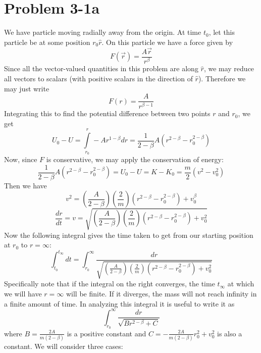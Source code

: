
\section*{Problem 3-1a}
We have particle moving radially away from the origin. At time $t_0$, let this particle be at some position $r_0 \hat{r}$. On this particle we have a force given by 
\[ F(\vec{r}) = \frac{A\vec{r}}{r^\beta} \]
Since all the vector-valued quantities in this problem are along $\hat{r}$, we may reduce all vectors to scalars (with positive scalars in the direction of $\hat{r}$). Therefore we may just write
\[ F(r) = \frac{A}{r^{\beta-1}} \]
Integrating this to find the potential difference between two points $r$ and $r_0$, we get
\[ U_0 - U=  \int\limits_{r_0}^r -Ar^{1-\beta} dr = \frac{1}{2-\beta} A(r^{2-\beta}-r_0^{2-\beta}) \]
Now, since $F$ is conservative, we may apply the conservation of energy:
\[  \frac{1}{2-\beta} A(r^{2-\beta}-r_0^{2-\beta})  = U_0-U = K-K_0 = \frac{m}{2}(v^2-v_0^2) \]
Then we have
\[ v^2 = \left(\frac{A}{2-\beta}\right)\left(\frac{2}{m}\right)(r^{2-\beta} - r_0^{2-\beta}) + v_0^\beta \]
\[ \frac{dr}{dt} = v = \sqrt{\left(\frac{A}{2-\beta}\right)\left(\frac{2}{m}\right)(r^{2-\beta} - r_0^{2-\beta}) + v_0^2} \]
Now the following integral gives the time taken to get from our starting position at $r_0$ to $r=\infty$:
\[ \int_{t_0}^{t_\infty} dt = \int_{r_0}^{\infty} \dfrac{dr}{\sqrt{\left(\frac{A}{2-\beta}\right)\left(\frac{2}{m}\right)(r^{2-\beta} - r_0^{2-\beta}) + v_0^2} } \]
Specifically note that if the integral on the right converges, the time $t_\infty$ at which we will have $r=\infty$ will be finite. If it diverges, the mass will not reach infinity in a finite amount of time. 
In analyzing this integral it is useful to write it as 
\[ \int_{r_0}^\infty \dfrac{dr}{\sqrt{Br^{2-\beta}+C}} \]
where $B=\frac{2A}{m(2-\beta)}$ is a positive constant and $C=-\frac{2A}{m(2-\beta)} r_0^2 + v_0^2$ is also a constant. We will consider three cases:
